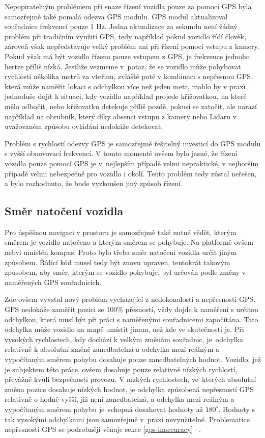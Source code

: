 \documentclass[czech, bachelor]{diploma}
\newcommand{\peteref}[1]{\ref{#1}\,--\,\nameref{#1}}
\begin{document}
Nepopiratelným problémem při snaze řízení vozidla pouze za pomocí GPS byla samozřejmě také pomalá odezva GPS modulu. GPS modul
aktualizoval souřadnice frekvencí pouze 1 Hz. Jedna aktualizace za sekundu není žádný problém při tradičním využití GPS, tedy
například pokud vozidlo řídí člověk, zároveň však nepředstavuje velký problém ani při řízení pomocí vstupu z kamery. Pokud však
má být vozidlo řízeno pouze vstupem z GPS, je frekvence jednoho hertze příliš nízká. Jestliže vezmeme v~potaz, že se vozidlo může
pohybovat rychlostí několika metrů za vteřinu, zvláště poté v kombinaci s nepřesnou GPS, která může naměřit lokaci s odchylkou
více než jeden metr, mohlo by v praxi jednoduše dojít k situaci, kdy vozidlo například projede křižovatkou, na které mělo odbočit,
nebo křižovatku detekuje příliš pozdě, pokusí se zatočit, ale narazí například na obrubník, který díky absenci vstupu z kamery
nebo Lidaru v uvažovaném způsobu ovládání nedokáže detekovat.

Problém s rychlostí odezvy GPS je samozřejmě řešitelný investicí do GPS modulu s vyšší obnovovací frekvencí. V tomto momentě ovšem
bylo jasné, že řízení vozidla pouze pomocí GPS je v~nejlepším případě velmi nepraktické, v nejhorším případě velmi nebezpečné
pro vozidlo i okolí. Tento problém tedy zůstal neřešen, a bylo rozhodnuto, že bude vyzkoušen jiný způsob řízení.

\subsection{Směr natočení vozidla} \label{directions-and-angles}

Pro úspěšnou navigaci v prostoru je samozřejmě také nutné vědět, kterým směrem je vozidlo natočeno a kterým směrem se pohybuje.
Na platformě ovšem nebyl umístěn kompas. Proto bylo třeba směr natočení vozidla určit jiným způsobem. Řídící kód musel tedy být
znovu upraven, tentokrát takovým způsobem, aby směr, kterým se vozidlo pohybuje, byl určován podle změny v naměřených GPS
souřadnicích.

Zde ovšem vyvstal nový problém vycházející z nedokonalosti a nepřesnosti GPS. GPS nedokáže zaměřit pozici se 100\% přesností,
vždy dojde k naměření s určitou odchylkou, která musí být při práci s naměřenými souřadnicemi započítána. Tato odchylka může
vozidlo na mapě umístit jinam, než kde ve skutečnosti je. Při vysokých rychlostech, kdy dochází k velkým změnám souřadnic,
je~odchylka relativně k absolutní změně zanedbatelná a odchylka mezi reálným a vypočítaným směrem pohybu dosahuje pouze
zanedbatelných hodnot. Vozidlo, jež je subjektem této práce, ovšem dosahuje pouze relativně nízkých rychlostí, převážně kvůli
bezpečnosti provozu. V nízkých rychlostech, ve~kterých absolutní změna pozice dosahuje nízkých hodnot, je odchylka způsobená
nepřesností GPS relativně o hodně vyšší, již není zanedbatelná, a odchylka mezi reálným a vypočítaným směrem pohybu je~schopná
dosahovat hodnoty až $180^{\circ}$. Hodnoty s tak vysokými odchylkami jsou samozřejmě v~praxi nevyužitelné. Problematice
nepřesnosti GPS se podrobněji věnuje sekce \peteref{gps-inaccuracy}.
\end{document}
